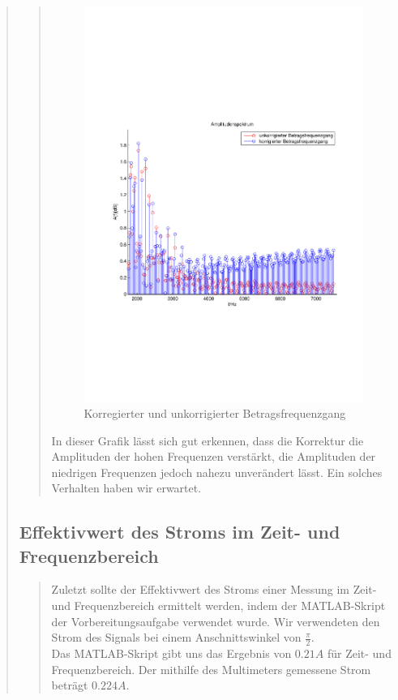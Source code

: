 \begin{quote}
\begin{quote}
        \begin{figure}[H]
        \centering
            \includegraphics[scale=0.7, trim = 1.5cm 7cm 1.5cm 8.5cm,
            clip]{./Bilder/betragsfrequenzgang_korr_vs_unkorr_zoom}
                \caption{Korregierter und unkorrigierter Betragsfrequenzgang}
        \end{figure}
    
        In dieser Grafik lässt sich gut erkennen, dass die Korrektur die
        Amplituden der hohen Frequenzen verstärkt, die Amplituden der niedrigen Frequenzen 
        jedoch nahezu unverändert lässt. Ein solches Verhalten haben wir erwartet.
        
	\end{quote}
	
	\subsection{Effektivwert des Stroms im Zeit- und Frequenzbereich}
	\begin{quote}
	Zuletzt sollte der Effektivwert des Stroms einer Messung im Zeit- und
	Frequenzbereich ermittelt werden, indem der MATLAB-Skript der
	Vorbereitungsaufgabe verwendet wurde. Wir verwendeten den Strom des Signals bei
	einem Anschnittswinkel von $\frac{\pi}{2}$.\\
	Das MATLAB-Skript gibt uns das Ergebnis von $0.21 A$ für Zeit- und
	Frequenzbereich. Der mithilfe des Multimeters gemessene Strom beträgt $0.224
	A$.\\
	

\end{quote}
\end{quote}
